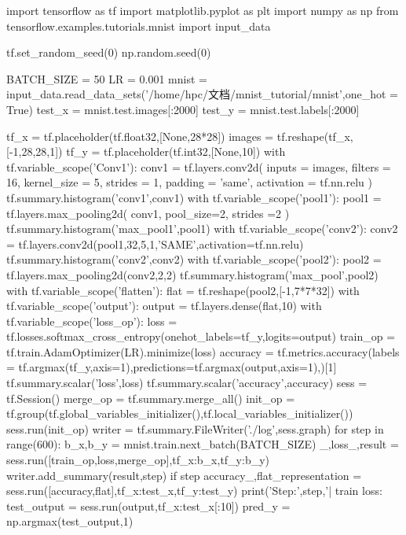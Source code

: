 \begin{python}
import tensorflow as tf
import matplotlib.pyplot as plt
import numpy as np
from tensorflow.examples.tutorials.mnist import input_data

tf.set_random_seed(0)
np.random.seed(0)

BATCH_SIZE = 50
LR = 0.001
mnist = input_data.read_data_sets('/home/hpc/文档/mnist_tutorial/mnist',one_hot = True)
test_x = mnist.test.images[:2000]
test_y = mnist.test.labels[:2000]

tf_x = tf.placeholder(tf.float32,[None,28*28])
images = tf.reshape(tf_x,[-1,28,28,1])
tf_y = tf.placeholder(tf.int32,[None,10])
with tf.variable_scope('Conv1'):
    conv1 = tf.layers.conv2d(
            inputs = images,
            filters = 16,
            kernel_size = 5,
            strides = 1,
            padding = 'same',
            activation = tf.nn.relu
        )
    tf.summary.histogram('conv1',conv1)
with tf.variable_scope('pool1'):
    pool1 = tf.layers.max_pooling2d(
            conv1,
            pool_size=2,
            strides =2
        )
    tf.summary.histogram('max_pool1',pool1)
with tf.variable_scope('conv2'):
    conv2 = tf.layers.conv2d(pool1,32,5,1,'SAME',activation=tf.nn.relu)
    tf.summary.histogram('conv2',conv2)
with tf.variable_scope('pool2'):
    pool2 = tf.layers.max_pooling2d(conv2,2,2)
    tf.summary.histogram('max_pool',pool2)
with tf.variable_scope('flatten'):
    flat = tf.reshape(pool2,[-1,7*7*32])
with tf.variable_scope('output'):
    output = tf.layers.dense(flat,10)
with tf.variable_scope('loss_op'):
    loss = tf.losses.softmax_cross_entropy(onehot_labels=tf_y,logits=output)
    train_op = tf.train.AdamOptimizer(LR).minimize(loss)
    accuracy = tf.metrics.accuracy(labels = tf.argmax(tf_y,axis=1),predictions=tf.argmax(output,axis=1),)[1]
    tf.summary.scalar('loss',loss)
    tf.summary.scalar('accuracy',accuracy)
sess = tf.Session()
merge_op = tf.summary.merge_all()
init_op = tf.group(tf.global_variables_initializer(),tf.local_variables_initializer())
sess.run(init_op)
writer = tf.summary.FileWriter('./log',sess.graph)
for step in range(600):
    b_x,b_y = mnist.train.next_batch(BATCH_SIZE)
    _,loss_,result = sess.run([train_op,loss,merge_op],{tf_x:b_x,tf_y:b_y})
    writer.add_summary(result,step)
    if step%
        accuracy_,flat_representation = sess.run([accuracy,flat],{tf_x:test_x,tf_y:test_y})
        print('Step:',step,'| train loss:%
test_output = sess.run(output,{tf_x:test_x[:10]})
pred_y = np.argmax(test_output,1)
\end{python}
